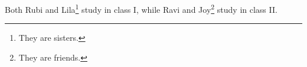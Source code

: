 \documentclass{article}
\begin{document}
Both Rubi and Lila\footnote{They are sisters.} study
in class I, while Ravi and Joy\footnote{They are
    friends.\label{fn:friends}} study in class II.
\end{document}
